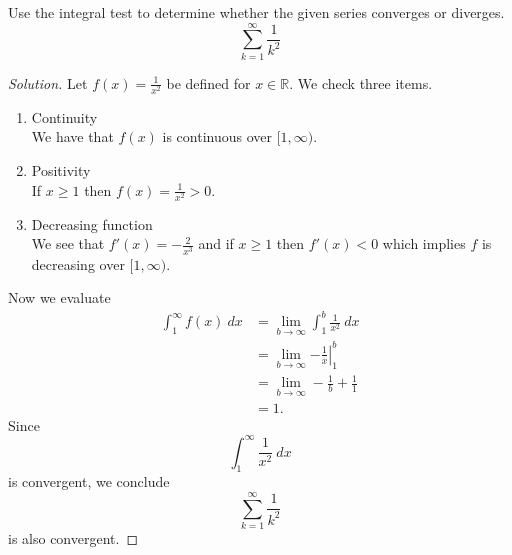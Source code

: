 \documentclass[compacto,10pt,comentarios]{aleph-notas}
\begin{document}
\begin{ejer}
    Use the integral test to determine whether the given series converges or diverges.
    $$
        \sum_{k=1}^{\infty} \frac{1}{k^2}
    $$
\end{ejer}
\begin{proof}[Solution]
    Let $f(x) = \frac{1}{x^2}$ be defined for $x \in \mathbb{R}$. We check three items.
    \begin{enumerate}
        \item Continuity \\
        We have that $f(x)$ is continuous over $[1, \infty)$.
        \item Positivity \\
        If $x \geq 1$ then $f(x) = \frac{1}{x^2} > 0$.
        \item Decreasing function \\
        We see that $f'(x) = -\frac{2}{x^3}$ and if $x \geq 1$ then $f'(x) < 0$ which implies $f$ is decreasing over $[1, \infty)$.
    \end{enumerate}
    Now we evaluate
    \begin{align*}
        \int_{1}^{\infty} f(x) ~ dx 
            & = \lim_{b \to \infty} \int_{1}^{b} \frac{1}{x^2} ~ dx  \\
            & = \lim_{b \to \infty} \left. -\frac{1}{x} \right\rvert_{1}^{b} \\
            & = \lim_{b \to \infty} -\frac{1}{b} + \frac{1}{1} \\
            & = 1.
    \end{align*}
    Since
    $$
        \int_{1}^{\infty} \frac{1}{x^2} ~ dx
    $$
    is convergent, we conclude
    $$
        \sum_{k=1}^{\infty} \frac{1}{k^2}
    $$
    is also convergent.
\end{proof}
\end{document}
